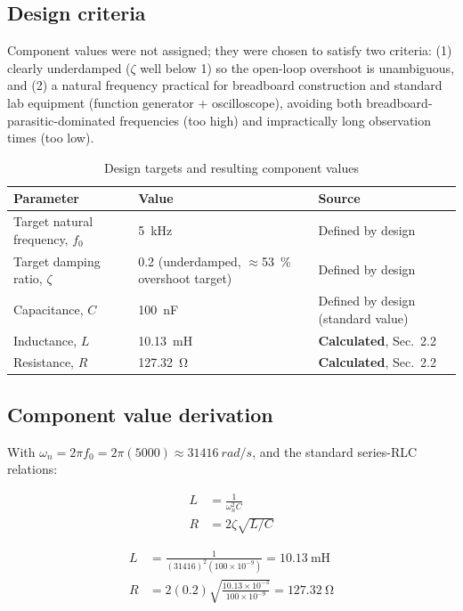 \documentclass[11pt,letterpaper]{article}
\begin{document}
\subsection{Design criteria}

Component values were not assigned; they were chosen to satisfy two criteria: (1) clearly underdamped
($\zeta$ well below 1) so the open-loop overshoot is unambiguous, and (2) a natural frequency practical
for breadboard construction and standard lab equipment (function generator + oscilloscope), avoiding
both breadboard-parasitic-dominated frequencies (too high) and impractically long observation times (too
low).

\begin{table}[H]
\centering
\caption{Design targets and resulting component values}
\begin{tabular}{@{}p{5cm}p{6cm}p{3.5cm}@{}}
\toprule
\textbf{Parameter} & \textbf{Value} & \textbf{Source} \\
\midrule
Target natural frequency, $f_0$ & \SI{5}{\kilo\hertz} & Defined by design \\
Target damping ratio, $\zeta$ & 0.2 (underdamped, $\approx$\SI{53}{\percent} overshoot target) & Defined by design \\
Capacitance, $C$ & \SI{100}{\nano\farad} & Defined by design (standard value) \\
Inductance, $L$ & \SI{10.13}{\milli\henry} & \textbf{Calculated}, Sec.~2.2 \\
Resistance, $R$ & \SI{127.32}{\ohm} & \textbf{Calculated}, Sec.~2.2 \\
\bottomrule
\end{tabular}
\end{table}

\subsection{Component value derivation}

With $\omega_n = 2\pi f_0 = 2\pi(5000) \approx \SI{31416}{rad/s}$, and the standard series-RLC relations:

\begin{tcolorbox}[colback=blue!5,colframe=blue!40!black,arc=1mm]
\begin{align}
L &= \frac{1}{\omega_n^2 C} \\
R &= 2\zeta\sqrt{L/C}
\end{align}
\end{tcolorbox}

\begin{align}
L &= \frac{1}{(31416)^2 (100\times10^{-9})} = \SI{10.13}{\milli\henry} \\
R &= 2(0.2)\sqrt{\frac{10.13\times10^{-3}}{100\times10^{-9}}} = \SI{127.32}{\ohm}
\end{align}
\end{document}
